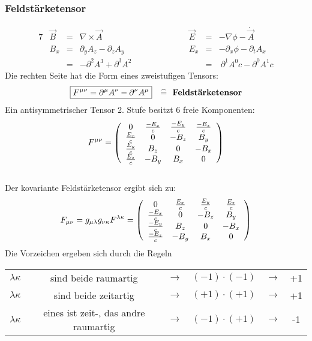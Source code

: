 \subsubsection{Feldstärketensor}
\begin{alignat*}{7}
&\vec B &=& \nabla \times \vec A \qquad \qquad \qquad &\vec E  \ \ &=& -\nabla \phi - \dot{\vec A}\\
&B_x &=& \partial_yA_z-\partial_zA_y \qquad\qquad\qquad &E_x &=& -\partial_x\phi - \partial_tA_x\\
&{}&=& -\partial^2A^3+ \partial^3A^2\qquad\qquad\qquad &{} &=& \ \partial^1A^0c - \partial^0A^1c
\end{alignat*}
Die rechten Seite hat die Form eines zweistufigen Tensors:\begin{eqnarray*}\boxed{F^{\mu\nu} = \partial^{\mu}A^{\nu}-\partial^{\nu}A^{\mu}} \quad \widehat = \ \ \text{\bf Feldstärketensor}\end{eqnarray*}
Ein antisymmetrischer Tensor 2. Stufe besitzt 6 freie Komponenten:
\begin{eqnarray*}
F^{\mu\nu} = \left ( \begin{array}{cccc} 0	& \frac{-E_x}c	&\frac{-E_y}c	&\frac{-E_z}c\\
				\frac{E_x}c	& 0		&-B_z		&B_y\\
				\frac{E_y}c	& B_z		& 0 		& -B_x\\
				\frac{E_z}c	&-B_y		&B_x		&0 \end{array}\right)
\end{eqnarray*}\\
Der kovariante Feldstärketensor ergibt sich zu:
\begin{eqnarray*}
F_{\mu\nu} = g_{\mu\lambda}g_{\nu\kappa}F^{\lambda \kappa} =
 \left ( \begin{array}{cccc}            0       & \frac{E_x}c	&\frac{E_y}c	&\frac{E_z}c\\
				\frac{-E_x}c	& 0		&-B_z		&B_y\\
				\frac{-E_y}c	& B_z		& 0 		& -B_x\\
				\frac{-E_z}c	&-B_y		&B_x		&0 \end{array}\right)
\end{eqnarray*}
Die Vorzeichen ergeben sich durch die Regeln
\begin{center}
	\begin{tabular}{cccccc}
		$\lambda \kappa$ &sind beide raumartig& $\rightarrow$ & $(-1) \cdot (-1)$ & $\rightarrow$& +1 \\
		$\lambda \kappa$ &sind beide zeitartig & $\rightarrow$& $(+1) \cdot (+1)$ & $\rightarrow$& +1 \\
		 $\lambda \kappa$ &eines ist zeit-, das andre raumartig & $\rightarrow$ & $(-1) \cdot (+1)$& $\rightarrow$ & -1 \\
	\end{tabular}
\end{center}

